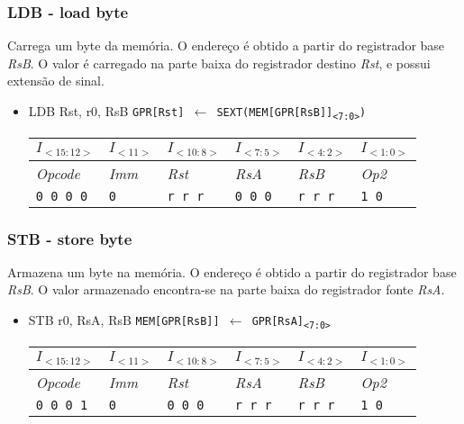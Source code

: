\documentclass{extreport}
\begin{document}
\subsubsection{LDB - load byte}
Carrega um byte da memória. O endereço é obtido a partir do registrador base \textit{RsB}. O valor é carregado na parte baixa do registrador destino \textit{Rst}, e possui extensão de sinal.

\begin{itemize}
\item LDB Rst, r0, RsB
\subitem \texttt{GPR[Rst] $\leftarrow$ SEXT(MEM[GPR[RsB]]\textsubscript{<7:0>})}
\begin{table}[ht!]
\centering
\begin{tabular}{|p{1.6cm}|p{1.6cm}|p{1.6cm}|p{1.6cm}|p{1.6cm}|p{1.6cm}|}
\hline
$I_{<15:12>}$ & $I_{<11>}$ & $I_{<10:8>}$ & $I_{<7:5>}$ & $I_{<4:2>}$ & $I_{<1:0>}$ \\ \hline
\textit{Opcode} & \textit{Imm} & \textit{Rst} & \textit{RsA} & \textit{RsB} & \textit{Op2} \\ \hline
\texttt{0 0 0 0} & \texttt{0} & \texttt{r r r} & \texttt{0 0 0} & \texttt{r r r} & \texttt{1 0} \\ \hline
\end{tabular}
\end{table}
\end{itemize}

\subsubsection{STB - store byte}
Armazena um byte na memória. O endereço é obtido a partir do registrador base \textit{RsB}. O valor armazenado encontra-se na parte baixa do registrador fonte \textit{RsA}.

\begin{itemize}
\item STB r0, RsA, RsB
\subitem \texttt{MEM[GPR[RsB]] $\leftarrow$ GPR[RsA]\textsubscript{<7:0>}}
\begin{table}[ht!]
\centering
\begin{tabular}{|p{1.6cm}|p{1.6cm}|p{1.6cm}|p{1.6cm}|p{1.6cm}|p{1.6cm}|}
\hline
$I_{<15:12>}$ & $I_{<11>}$ & $I_{<10:8>}$ & $I_{<7:5>}$ & $I_{<4:2>}$ & $I_{<1:0>}$ \\ \hline
\textit{Opcode} & \textit{Imm} & \textit{Rst} & \textit{RsA} & \textit{RsB} & \textit{Op2} \\ \hline
\texttt{0 0 0 1} & \texttt{0} & \texttt{0 0 0} & \texttt{r r r} & \texttt{r r r} & \texttt{1 0} \\ \hline
\end{tabular}
\end{table}
\end{itemize}
\end{document}
